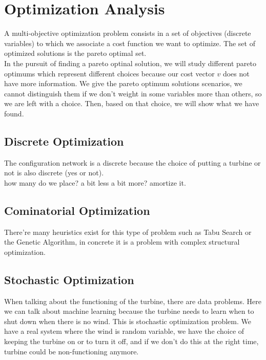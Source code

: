 \documentclass[12pt]{article}
\begin{document}
\section{Optimization Analysis}

A multi-objective optimization problem consists in a set of objectives (discrete variables) to which we associate a cost function we want to optimize. The set of optimized solutions is the pareto optimal set. \\

In the pursuit of finding a pareto optinal solution, we will study different pareto optimums which represent different choices because our cost vector  $v$ does not have more information. We give the pareto optimum solutions scenarios, we cannot distinguish them if we don't weight in some variables more than others, so we are left with a choice. Then, based on that choice, we will show what we have found. \\

\subsection{Discrete Optimization}
The configuration network is a discrete because the choice of putting a turbine or not is also
discrete (yes or not). \\

how many do we place? a bit less a bit more? amortize it.

\subsection{Cominatorial Optimization}
There're many heuristics exist for this type of problem such as Tabu Search or the Genetic Algorithm, in concrete it is a problem with complex structural optimization.  

\subsection{Stochastic Optimization}
When talking about the functioning of the turbine, there are data problems. Here we can talk about machine learning because the turbine needs to learn when to shut down when there is no wind. This is stochastic optimization problem. We have a real system where the wind is random variable, we have the choice of keeping the turbine on or to turn it off, and if we don't do this at the right time, turbine could be non-functioning anymore. \\ 
\end{document}

